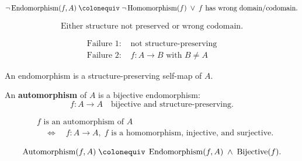 \begin{remark*}
\[
\neg \operatorname{Endomorphism}(f,A)
\;\colonequiv\;
\neg \operatorname{Homomorphism}(f)
\;\lor\;
f \text{ has wrong domain/codomain}.
\]
\end{remark*}

\begin{remark*}
\[
\text{Either structure not preserved or wrong codomain.}
\]
\end{remark*}

\begin{remark*}
\[
\begin{aligned}
\text{Failure 1: } &\text{not structure-preserving} \\
\text{Failure 2: } &f : A \to B \text{ with } B \ne A
\end{aligned}
\]
\end{remark*}

\begin{remark*}[Interpretation]
An endomorphism is a structure-preserving self-map of $A$.
\end{remark*}


\begin{tcolorbox}[title={Definition --- Automorphism}]
\begin{definition}[Automorphism]
\label{def:automorphism}
An \textbf{automorphism} of $A$ is a bijective endomorphism:
\[
f : A \to A \quad \text{bijective and structure-preserving}.
\]
\end{definition}
\end{tcolorbox}

\begin{remark*}
\[
\begin{aligned}
&f \text{ is an automorphism of } A \\
&\quad\Longleftrightarrow\quad
f : A \to A,\;
f \text{ is a homomorphism, injective, and surjective}.
\end{aligned}
\]
\end{remark*}

\begin{remark*}
\[
\operatorname{Automorphism}(f,A)
\;\colonequiv\;
\operatorname{Endomorphism}(f,A)
\;\land\;
\operatorname{Bijective}(f).
\]
\end{remark*}

